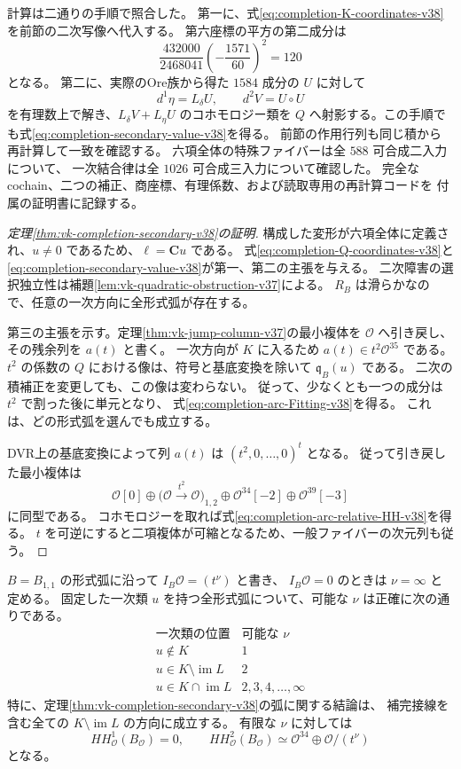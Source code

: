 計算は二通りの手順で照合した。
第一に、式\eqref{eq:completion-K-coordinates-v38}を前節の二次写像へ代入する。
第六座標の平方の第二成分は
\[
 \frac{432000}{2468041}\left(-\frac{1571}{60}\right)^2=120
\]
となる。
第二に、実際のOre族から得た $1584$ 成分の $U$ に対して
\[
 d^1\eta=L_\delta U,\qquad d^2V=U\circ U
\]
を有理数上で解き、$L_\delta V+L_\eta U$ のコホモロジー類を
$Q$ へ射影する。この手順でも式\eqref{eq:completion-secondary-value-v38}を得る。
前節の作用行列も同じ積から再計算して一致を確認する。
六項全体の特殊ファイバーは全 $588$ 可合成二入力について、
一次結合律は全 $1026$ 可合成三入力について確認した。
完全なcochain、二つの補正、商座標、有理係数、および読取専用の再計算コードを
付属の証明書に記録する。

\begin{proof}[定理\ref{thm:vk-completion-secondary-v38}の証明]
構成した変形が六項全体に定義され、$u\ne0$ であるため、$\ell=\mathbf C u$ である。
式\eqref{eq:completion-Q-coordinates-v38}と
\eqref{eq:completion-secondary-value-v38}が第一、第二の主張を与える。
二次障害の選択独立性は補題\ref{lem:vk-quadratic-obstruction-v37}による。
$R_B$ は滑らかなので、任意の一次方向に全形式弧が存在する。

第三の主張を示す。定理\ref{thm:vk-jump-column-v37}の最小複体を
$\mathcal O$ へ引き戻し、その残余列を $a(t)$ と書く。
一次方向が $K$ に入るため $a(t)\in t^2\mathcal O^{35}$ である。
$t^2$ の係数の $Q$ における像は、符号と基底変換を除いて
$\mathfrak q_B(u)$ である。
二次の積補正を変更しても、この像は変わらない。
従って、少なくとも一つの成分は $t^2$ で割った後に単元となり、
式\eqref{eq:completion-arc-Fitting-v38}を得る。
これは、どの形式弧を選んでも成立する。

DVR上の基底変換によって列 $a(t)$ は $(t^2,0,\ldots,0)^t$ となる。
従って引き戻した最小複体は
\[
 \mathcal O[0]\oplus
 \bigl(\mathcal O\xrightarrow{\,t^2\,}\mathcal O\bigr)_{1,2}
 \oplus\mathcal O^{34}[-2]\oplus\mathcal O^{39}[-3]
\]
に同型である。
コホモロジーを取れば式\eqref{eq:completion-arc-relative-HH-v38}を得る。
$t$ を可逆にすると二項複体が可縮となるため、一般ファイバーの次元列も従う。
\end{proof}

\begin{corollary}[初速度別の対称性消失次数]
\label{cor:vk-arcs-order-strata-v38}
$B=B_{1,1}$ の形式弧に沿って $I_B\mathcal O=(t^\nu)$ と書き、
$I_B\mathcal O=0$ のときは $\nu=\infty$ と定める。
固定した一次類 $u$ を持つ全形式弧について、可能な $\nu$ は正確に次の通りである。
\[
\begin{array}{c|c}
 \text{一次類の位置}&\text{可能な }\nu\\\hline
 u\notin K&1\\
 u\in K\setminus\operatorname{im}L&2\\
 u\in K\cap\operatorname{im}L&2,3,4,\ldots,\infty
\end{array}
\]
特に、定理\ref{thm:vk-completion-secondary-v38}の弧に関する結論は、
補完接線を含む全ての $K\setminus\operatorname{im}L$ の方向に成立する。
有限な $\nu$ に対しては
\[
 HH^1_{\mathcal O}(B_{\mathcal O})=0,\qquad
 HH^2_{\mathcal O}(B_{\mathcal O})
       \simeq\mathcal O^{34}\oplus\mathcal O/(t^\nu)
\]
となる。
\end{corollary}

